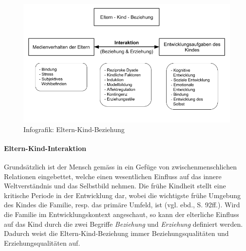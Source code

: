 \begin{figure}%
  \centering
     \includegraphics[width=1.0\textwidth]{content/Grafik/Infografik_ElternKindBeziehung_Uebersicht.png}
  \caption{Infografik: Eltern-Kind-Beziehung}
  \label{fig:InfografikElternKindBeziehung}
\end{figure}

\paragraph{Eltern-Kind-Interaktion}\label{sec:Interaktion}
Grundsätzlich ist der Mensch gemäss  in ein Gefüge von zwischenmenschlichen Relationen eingebettet, welche einen wesentlichen Einfluss auf das innere Weltverständnis und das Selbstbild nehmen.  Die frühe Kindheit stellt eine kritische Periode in der Entwicklung dar, wobei die wichtigste frühe Umgebung des Kindes die Familie, resp. das primäre Umfeld, ist (vgl. ebd., S. 92ff.). Wird die Familie im Entwicklungskontext angeschaut, so kann der elterliche Einfluss auf das Kind durch die zwei Begriffe \textit{Beziehung} und \textit{Erziehung} definiert werden. Dadurch weist die Eltern-Kind-Beziehung immer Beziehungsqualitäten und Erziehungsqualitäten auf.  

